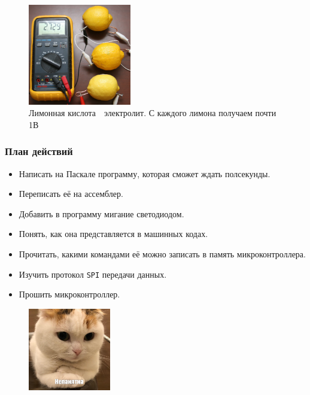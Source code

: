 \documentclass[aspectratio=169, pdf, 8pt, unicode]{beamer}
\begin{document}
\begin{frame}[fragile]
	\begin{figure}[H]
		\centering
		\includegraphics[width=0.4\textwidth]{resources/lemons.jpg}
		\caption{Лимонная кислота\ \cyrdash\ электролит. С каждого лимона получаем почти 1В}
	\end{figure}
\end{frame}

\begin{frame}[fragile]
\frametitle{План действий}
	\begin{itemize}
		\item Написать на Паскале программу, которая сможет ждать полсекунды.
		\item Переписать её на ассемблер.
		\item Добавить в программу мигание светодиодом.
		\item Понять, как она представляется в машинных кодах.
		\item Прочитать, какими командами её можно записать в память микроконтроллера.
		\item Изучить протокол \texttt{SPI} передачи данных.
		\item Прошить микроконтроллер.
	\end{itemize}
	\begin{figure}[H]
		\centering
		\vspace*{-0.5cm}
		\includegraphics[width=0.32\textwidth]{resources/kitty_rus.jpg}
	\end{figure}
\end{frame}
\end{document}
